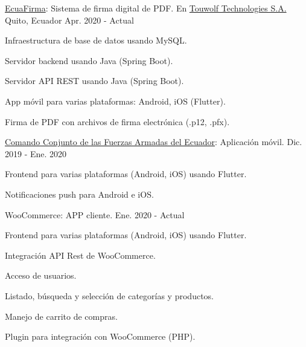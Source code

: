 
\begin{cventries}

  \cventry
    {\href{https://ecuafirma.com}{EcuaFirma}: Sistema de firma digital de PDF.} %
    {En \href{https://touwolf.com/}{Touwolf Technologies S.A.}} %
    {Quito, Ecuador} %
    {Apr. 2020 - Actual} %
    {
      \begin{cvitems} %
        \item {Infraestructura de base de datos usando MySQL.}
        \item {Servidor backend usando Java (Spring Boot).}
        \item {Servidor API REST usando Java (Spring Boot).}
        \item {App móvil para varias plataformas: Android, iOS (Flutter).}
        \item {Firma de PDF con archivos de firma electrónica (.p12, .pfx).}
      \end{cvitems}
    }

  \cventry
    {\href{https://www.ccffaa.mil.ec/}{Comando Conjunto de las Fuerzas Armadas del Ecuador}: Aplicación móvil.} %
    {} %
    {} %
    {Dic. 2019 - Ene. 2020} %
    {
      \begin{cvitems} %
        \item {Frontend para varias plataformas (Android, iOS) usando Flutter.}
        \item {Notificaciones push para Android e iOS.}
      \end{cvitems}
    }

  \cventry
    {WooCommerce: APP cliente.} %
    {} %
    {} %
    {Ene. 2020 - Actual} %
    {
      \begin{cvitems} %
        \item {Frontend para varias plataformas (Android, iOS) usando Flutter.}
        \item {Integración API Rest de WooCommerce.}
        \item {Acceso de usuarios.}
        \item {Listado, búsqueda y selección de categorías y productos.}
        \item {Manejo de carrito de compras.}
        \item {Plugin para integración con WooCommerce (PHP).}
      \end{cvitems}
    }


\end{cventries}
